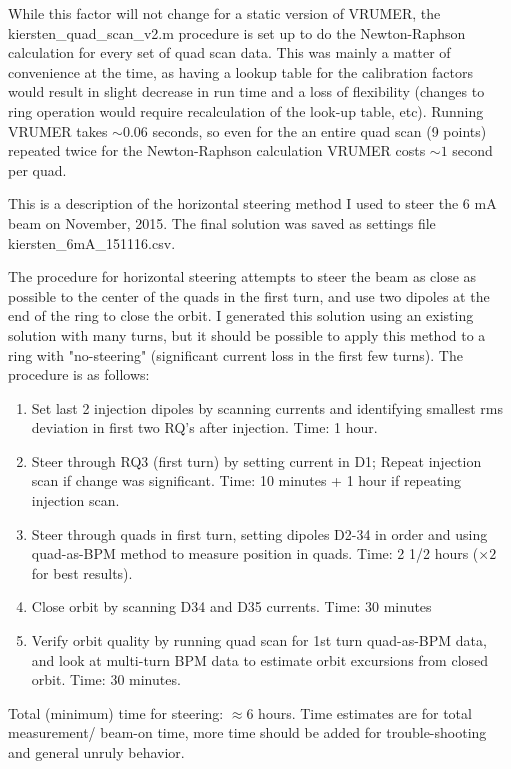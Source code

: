 While this factor will not change for a static version of VRUMER, the \newline  kiersten\_quad\_scan\_v2.m procedure is 
set up to do the Newton-Raphson calculation for every set of quad scan data. This was mainly a matter of convenience at 
the time, as having a lookup table for the calibration factors would result in slight decrease in run time and a loss of 
flexibility (changes to ring operation would require recalculation of the look-up table, etc). Running VRUMER takes $\sim 0.06$ 
seconds, so even for the an entire quad scan (9 points) repeated twice for the Newton-Raphson calculation VRUMER 
costs $\sim 1$ second per quad. 



This is a description of the horizontal steering method I used to steer the 6 mA beam on November, 2015. The final solution was saved as settings file kiersten\_6mA\_151116.csv.

The procedure for horizontal steering attempts to steer the beam as close as possible to the center of the quads in the first turn, and use two dipoles at the end of the ring to close the orbit. I generated this solution using an existing solution with many turns, but it should be possible to apply this method to a ring with "no-steering" (significant current loss in the first few turns).
The procedure is as follows:

\begin{enumerate}
\item Set last 2 injection dipoles by scanning currents and identifying smallest rms deviation in first two RQ's after injection. Time: 1 hour.
\item Steer through RQ3 (first turn) by setting current in D1; Repeat injection scan if change was significant. Time: 10 minutes + 1 hour if repeating injection scan.
\item Steer through quads in first turn, setting dipoles D2-34 in order and using quad-as-BPM method to measure position in quads. Time: 2 1/2 hours ($\times 2$ for best results).
\item Close orbit by scanning D34 and D35 currents.  Time: 30 minutes
\item Verify orbit quality by running quad scan for 1st turn quad-as-BPM data, and look at multi-turn BPM data to estimate orbit excursions from closed orbit. Time: 30 minutes.
\end{enumerate}

 Total (minimum) time for steering: $\approx 6$ hours. Time estimates are for total measurement/ beam-on time, more time should be added for trouble-shooting and general unruly behavior.
 
